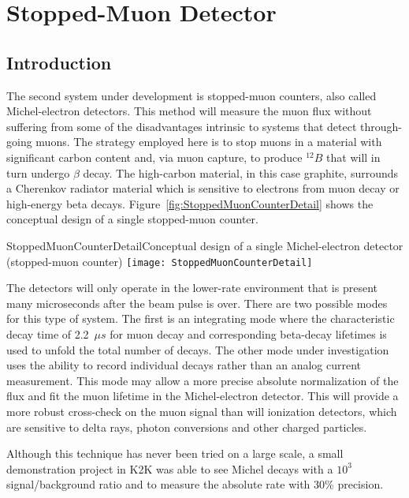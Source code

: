 %
%
\section{Stopped-Muon Detector} %
\label{sec:nd-blm-stopped-mu}

\subsection{Introduction}

The second system under development is stopped-muon counters, also called
Michel-electron detectors. This method will measure the muon flux without
suffering from some of the disadvantages intrinsic to systems that
detect through-going muons. The strategy employed here is to stop muons
in a material with significant carbon content 
and, via muon capture, to produce $^{12}B$ that will in turn undergo $\beta$ decay.
 The high-carbon material, in this case graphite, surrounds a Cherenkov radiator
material which is sensitive to electrons from muon decay or 
high-energy beta decays.  Figure~\ref{fig:StoppedMuonCounterDetail} 
shows the conceptual design of a single stopped-muon counter. 


\begin{cdrfigure}{StoppedMuonCounterDetail}{Conceptual design of a single Michel-electron detector (stopped-muon counter)}
\texttt{[image: StoppedMuonCounterDetail]}
\end{cdrfigure}

The detectors will only operate in the lower-rate
environment that is present many microseconds after the beam pulse is
over. There are two possible modes for this type of system. 
The first is an integrating mode where the characteristic decay time of 
2.2~$\mu s$ for muon decay and corresponding beta-decay lifetimes is used to
unfold the total number of decays. The other mode under
investigation uses the ability to record individual decays rather
than an analog current measurement. This mode may allow a more precise absolute
normalization of the flux and fit the muon lifetime in the Michel-electron detector. 
This will provide a more robust cross-check on the
muon signal than will ionization detectors, which are sensitive to delta
rays, photon conversions and other charged particles.

Although this technique has never been tried on a large scale, a small
demonstration project in K2K was able to see Michel decays with a
$10^{3}$ signal/background ratio and to measure the absolute rate with
30\% precision\cite{ref:K2KMuDecayMon}.

